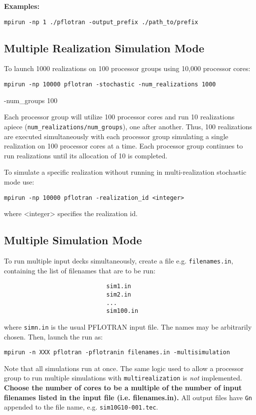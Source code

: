 \begin{mdframed}
{\bf Examples:}

\verb|mpirun -np 1 ./pflotran -output_prefix ./path_to/prefix|\\
\end{mdframed}


\subsection{Multiple Realization Simulation Mode}

To launch 1000 realizations on 100 processor groups using 10,000 processor cores:

\noindent
{\tt mpirun -np 10000 pflotran -stochastic -num\_realizations 1000 

-num\_groups 100}

\noindent
Each processor group will utilize 100 processor cores and run 10 realizations apiece \linebreak ({\tt num\_realizations/num\_groups}), one after another. Thus, 100 realizations are executed simultaneously with each processor group simulating a single realization on 100 processor cores at a time. Each processor group continues to run realizations until its allocation of 10 is completed.

\noindent
To simulate a specific realization without running in multi-realization stochastic mode use:

{\tt mpirun -np 10000 pflotran -realization\_id <integer>}

\noindent
where <integer> specifies the realization id.

\subsection{Multiple Simulation Mode}

To run multiple input decks simultaneously, create a file e.g. {\tt filenames.in}, containing the list of filenames that are to be run:
\begin{Verbatim}
                             sim1.in
                             sim2.in
                             ...
                             sim100.in
\end{Verbatim}
where {\tt simn.in} is the usual PFLOTRAN input file. The names may be arbitrarily chosen. Then, launch the run as:

\verb|mpirun -n XXX pflotran -pflotranin filenames.in -multisimulation| 

\noindent  
Note that all simulations run at once. The same logic used to allow a processor group to run multiple simulations with {\tt multirealization} is {\em not} implemented. {\bf Choose the number of cores to be a multiple of the number of input filenames listed in the input file (i.e. filenames.in).} All output files have {\tt Gn} appended to the file name, e.g. {\tt sim10G10-001.tec}.

